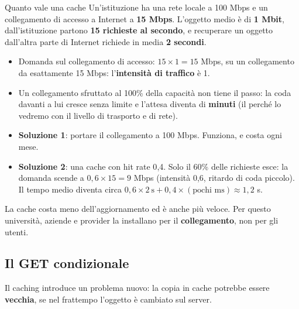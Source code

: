\begin{esempio}{Quanto vale una cache}
Un'istituzione ha una rete locale a 100 Mbps e un collegamento di accesso a Internet a \textbf{15 Mbps}.
L'oggetto medio è di \textbf{1 Mbit}, dall'istituzione partono \textbf{15 richieste al secondo}, e recuperare un
oggetto dall'altra parte di Internet richiede in media \textbf{2 secondi}.
\begin{itemize}
    \item Domanda sul collegamento di accesso: $15 \times 1 = 15$ Mbps, su un collegamento da esattamente
          15 Mbps: l'\textbf{intensità di traffico} è 1.
    \item Un collegamento sfruttato al 100\% della capacità non tiene il passo: la coda davanti a lui cresce
          senza limite e l'attesa diventa di \textbf{minuti} (il perché lo vedremo con il livello di trasporto e di
          rete).
    \item \textbf{Soluzione 1}: portare il collegamento a 100 Mbps. Funziona, e costa ogni mese.
    \item \textbf{Soluzione 2}: una cache con hit rate 0{,}4. Solo il 60\% delle richieste esce: la domanda
          scende a $0{,}6 \times 15 = 9$ Mbps (intensità 0{,}6, ritardo di coda piccolo). Il tempo medio diventa
          circa $0{,}6 \times 2\ \text{s} + 0{,}4 \times (\text{pochi ms}) \approx 1{,}2$ s.
\end{itemize}
La cache costa meno dell'aggiornamento ed è anche più veloce. Per questo università, aziende e provider la
installano per il \textbf{collegamento}, non per gli utenti.
\end{esempio}

\subsection{Il GET condizionale}

Il caching introduce un problema nuovo: la copia in cache potrebbe essere \textbf{vecchia}, se nel
frattempo l'oggetto è cambiato sul server.



